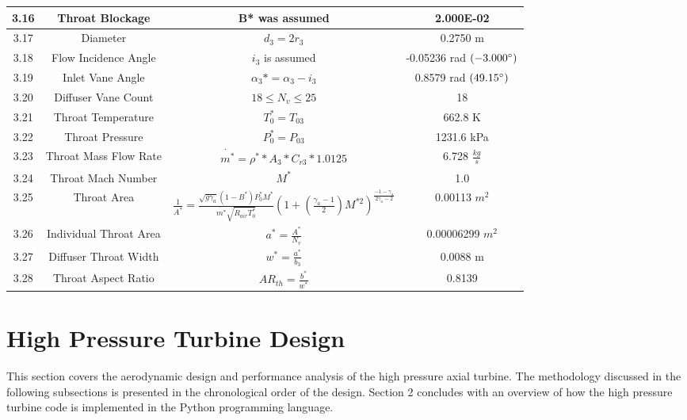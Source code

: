 \documentclass[12pt, letter]{report}
\begin{document}
\begin{table}[H]
\begin{tabular}{|c|c|c|c|}
 3.16& Throat Blockage& B* was assumed&2.000E-02\\\hline
 3.17& Diameter& $d_{3} = 2r_{3}$&0.2750 m\\\hline
 3.18& Flow Incidence Angle& $i_{3}$ is assumed&-0.05236 rad $(-3.000\degree)$\\\hline
 3.19& Inlet Vane Angle& $\alpha_{3}* = \alpha_{3} - i_{3}$&0.8579 rad $(49.15\degree)$\\\hline
 3.20& Diffuser Vane Count& $18 \leq N_{v} \leq 25$&18\\\hline
 3.21& Throat Temperature& $T_{0}^{*} = T_{03}$ & 662.8 K \\\hline
 3.22& Throat Pressure& $P_{0}^{*} = P_{03}$ & 1231.6 kPa \\\hline
 3.23& Throat Mass Flow Rate& $\dot{m^{*}} = \rho^{*} * A_{3} * C_{r3} * 1.0125$ & 6.728 $\frac{kg}{s}$ \\\hline 
 3.24& Throat Mach Number& $M^{*}$ & 1.0 \\\hline
 3.25& Throat Area& $\frac{1}{A^{*}} = \frac{\sqrt{g\gamma_{a}}(1 - B^{*})P_{0}^{*}M^{*}}{\dot{m^{*}}\sqrt{R_{air}T_{0}^{*}}} (1+(\frac{\gamma_{a} - 1}{2}) M^{*2})^{\frac{-1 - \gamma_{a}}{2\gamma_{a} - 2}} $& 0.00113 $m^{2}$ \\\hline
 3.26& Individual Throat Area& $a^{*} = \frac{A^{*}}{N_v}$ & 0.00006299 $m^{2}$ \\\hline
 3.27& Diffuser Throat Width& $w^{*} = \frac{a^{*}}{b_3}$ & 0.0088 m \\ \hline 
 3.28& Throat Aspect Ratio& $AR_{th} = \frac{b^{*}}{w^{*}}$ & 0.8139 \\ \hline
    \end{tabular}
    
    
\end{table}

\clearpage
\chapter{High Pressure Turbine Design}

This section covers the aerodynamic design and performance analysis of the high pressure axial turbine. The methodology discussed in the following subsections is presented in the chronological order of the design. Section 2 concludes with an overview of how the high pressure turbine code is implemented in the Python programming language. 
\end{document}

